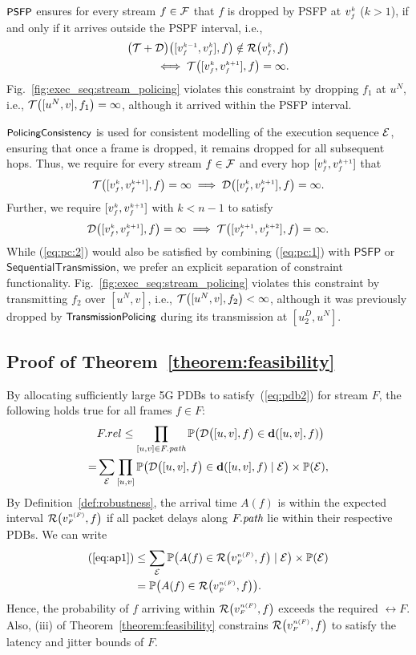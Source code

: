\textbf{$\PSFP$}
ensures for every stream $f \in \TT$ that $f$ is dropped by PSFP at $\v{k}{f}$ ($k > 1$), if and only if it arrives outside the PSPF interval, i.e.,
\begin{align*}
  \add{\T}{\D}{\pclink{k}{f},f} \notin \R{\v{k}{f},f} \\
    \iff \T{\clink{k}{f},f} = \infty.
\end{align*}
Fig.~\ref{fig:exec_seq:stream_policing} violates this constraint by dropping $f_1$ at $u^N$, i.e., $\T{[u^N, v], f_1} = \infty$, although it arrived within the PSFP interval.

\textbf{$\PC$}
is used for consistent modelling of the execution sequence $\E$, ensuring that once a frame is dropped, it remains dropped for all subsequent hops.
Thus, we require for every stream $f \in \TT$ and every hop $\clink{k}{f}$ that
\begin{equation} \label{eq:pc:1}
  \T{\clink{k}{f},f} = \infty \implies \D{\clink{k}{f},f} = \infty.
\end{equation}
Further, we require $\clink{k}{f}$ with $k < n - 1$ to satisfy
\begin{equation} \label{eq:pc:2}
  \D{\clink{k}{f},f} = \infty \implies \T{\nclink{k}{f},f} = \infty.
\end{equation}
While (\ref{eq:pc:2}) would also be satisfied by combining (\ref{eq:pc:1}) with $\textsf{PSFP}$ or $\textsf{SequentialTransmission}$, we prefer an explicit separation of constraint functionality.
Fig.~\ref{fig:exec_seq:stream_policing} violates this constraint by transmitting $f_2$ over $[u^N, v]$, i.e., $\T{[u^N, v], f_2} < \infty$, although it was previously dropped by $\TP$ during its transmission at $[u_2^D, u^N]$.

\subsection{Proof of Theorem~\ref{theorem:feasibility}} \label{appendix:feasibility}
By allocating sufficiently large 5G PDBs to satisfy~(\ref{eq:pdb2}) for stream $F$, the following holds true for all frames $f \in F$:
\begin{align}
  &\rel{F} \leq \prod_{[u,v] \in \path{F}} \Prob\big(\D{[u,v], f} \in \dpdb{[u,v], f}\big) \\
  = &\sum_{\E} \prod_{[u,v]} \Prob\big(\D{[u,v], f} \in \dpdb{[u,v], f} \mid \E \big) \times \Prob(\E), \label{eq:ap1}
\end{align}
By Definition~\ref{def:robustness}, the arrival time $A(f)$ is within the expected interval $\R{\vl{F}, f}$ if all packet delays along $\path{F}$ lie within their respective PDBs.
We can write 
\begin{align*}
  (\ref{eq:ap1}) &\leq \sum_{\E} \Prob\big(A(f) \in \R{\vl{F}, f} \mid \E\big) \times \Prob(\E) \\
   &= \Prob\big(A(f) \in \R{\vl{F}, f}\big).
\end{align*}
Hence, the probability of $f$ arriving within $\R{\vl{F}, f}$ exceeds the required $\rel{F}$.
Also, (iii) of Theorem~\ref{theorem:feasibility} constrains $\R{\vl{F}, f}$ to satisfy the latency and jitter bounds of $F$.

